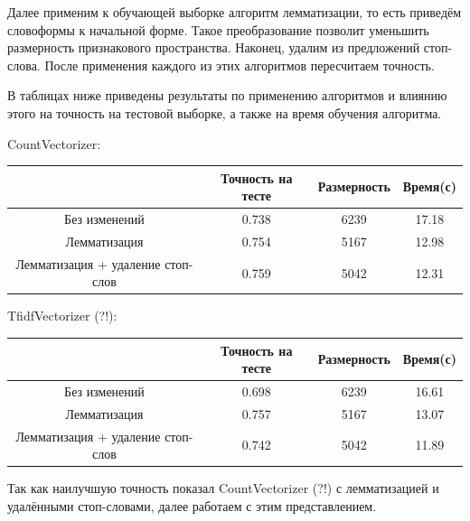 \documentclass{article}
\begin{document}
            Далее применим к обучающей выборке алгоритм лемматизации, то есть приведём словоформы к начальной форме. Такое преобразование позволит уменьшить размерность признакового пространства. Наконец, удалим из предложений стоп-слова. После применения каждого из этих алгоритмов пересчитаем точность.

            В таблицах ниже приведены результаты по применению алгоритмов и влиянию этого на точность на тестовой выборке, а также на время обучения алгоритма.

            CountVectorizer:
            \begin{center}
                \begin{tabular}{| c | c | c | c |}
                    \hline
                    & Точность на тесте & Размерность & Время(с) \\
                    \hline
                    Без изменений & 0.738 & 6239 & 17.18\\
                    \hline
                    Лемматизация & 0.754 & 5167 & 12.98 \\
                    \hline
                    Лемматизация + удаление стоп-слов & 0.759 & 5042 & 12.31 \\
                    \hline
                \end{tabular}
            \end{center}

            TfidfVectorizer (?!):
            \begin{center}
                \begin{tabular}{| c | c | c | c |}
                    \hline
                    & Точность на тесте & Размерность & Время(с) \\
                    \hline
                    Без изменений & 0.698 & 6239 & 16.61\\
                    \hline
                    Лемматизация & 0.757 & 5167 & 13.07 \\
                    \hline
                    Лемматизация + удаление стоп-слов & 0.742 & 5042 & 11.89 \\
                    \hline
                \end{tabular}
            \end{center}

            Так как наилучшую точность показал CountVectorizer (?!) с лемматизацией и удалёнными стоп-словами, далее работаем с этим представлением.
\end{document}
